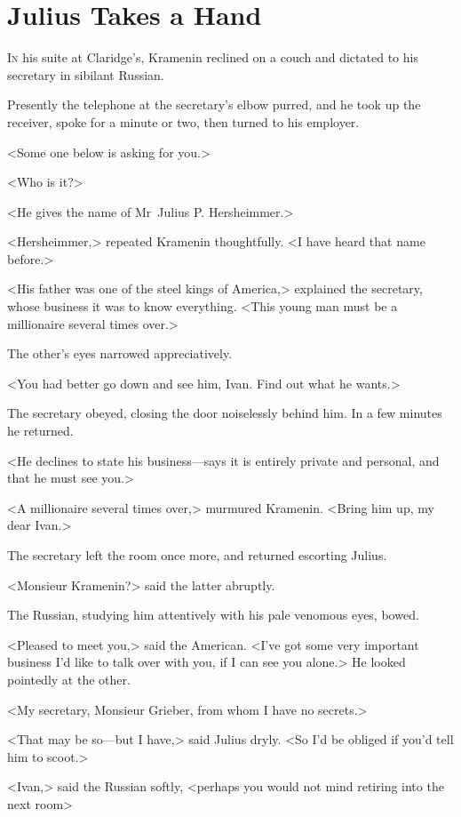 \chapter{Julius Takes a Hand} 

 \lettrine{I}{n} his suite at Claridge's, Kramenin reclined on a couch and dictated to his secretary in sibilant Russian.

\zz
Presently the telephone at the secretary's elbow purred, and he took up the receiver, spoke for a minute or two, then turned to his employer.

<Some one below is asking for you.>

<Who is it?>

<He gives the name of Mr~Julius P. Hersheimmer.>

<Hersheimmer,> repeated Kramenin thoughtfully. <I have heard that name before.>

<His father was one of the steel kings of America,> explained the secretary, whose business it was to know everything. <This young man must be a millionaire several times over.>

The other's eyes narrowed appreciatively.

<You had better go down and see him, Ivan. Find out what he wants.>

The secretary obeyed, closing the door noiselessly behind him. In a few minutes he returned.

<He declines to state his business—says it is entirely private and personal, and that he must see you.>

<A millionaire several times over,> murmured Kramenin. <Bring him up, my dear Ivan.>

The secretary left the room once more, and returned escorting Julius.

<Monsieur Kramenin?> said the latter abruptly.

The Russian, studying him attentively with his pale venomous eyes, bowed.

<Pleased to meet you,> said the American. <I've got some very important business I'd like to talk over with you, if I can see you alone.> He looked pointedly at the other.

<My secretary, Monsieur Grieber, from whom I have no secrets.>

<That may be so—but I have,> said Julius dryly. <So I'd be obliged if you'd tell him to scoot.>

<Ivan,> said the Russian softly, <perhaps you would not mind retiring into the next room\longdash>

